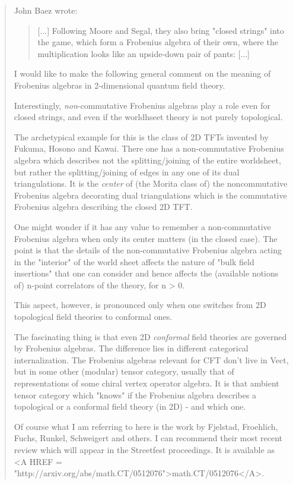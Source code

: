 \begin{quote}
John Baez wrote:

\begin{quote}
  [...]
  Following Moore and Segal, they also bring
  "closed strings" into the game, which form
  a Frobenius algebra of their own, where the
  multiplication looks like an upside-down pair
  of pants:
  [...]
\end{quote}

I would like to make the following general comment
on the meaning of Frobenius algebras in
2-dimensional quantum field theory.

Interestingly, \emph{non}-commutative Frobenius algebras
play a role even for closed strings, and even if the
worldhseet theory is not purely topological.

The archetypical example for this is the class of
2D TFTs invented by Fukuma, Hosono and Kawai. There
one has a non-commutative Frobenius algebra which
describes not the splitting/joining of the entire
worldsheet, but rather the splitting/joining of
edges in any one of its dual triangulations. It is the
\emph{center} of (the Morita class of) the noncommutative
Frobenius algebra decorating dual triangulations
which is the commutative Frobenius algebra describing
the closed 2D TFT.

One might wonder if it has any value to remember
a non-commutative Frobenius algebra when only its center
matters (in the closed case). The point is that the
details of the non-commutative Frobenius algebra acting
in the "interior" of the world sheet affects the
nature of "bulk field insertions" that one can consider
and hence affects the (available notions of) n-point
correlators of the theory, for n > 0.

This aspect, however, is pronounced only when one
switches from 2D topological field theories to
conformal ones.

The fascinating thing is that even 2D \emph{conformal} field
theories are governed by Frobenius algebras. The
difference lies in different categorical internalization.
The Frobenius algebras relevant for CFT don't live
in Vect, but in some other (modular) tensor category,
usually that of representations of some chiral vertex
operator algebra. It is that ambient tensor category
which "knows" if the Frobenius algebra describes a
topological or a conformal field theory (in 2D) -
and which one.

Of course what I am referring to here is the work
by Fjelstad, Froehlich, Fuchs, Runkel, Schweigert and
others. I can recommend their most recent review which
will appear in the Streetfest proceedings. It is
available as 
<A HREF = "http://arxiv.org/abs/math.CT/0512076">math.CT/0512076</A>.




\end{quote}
